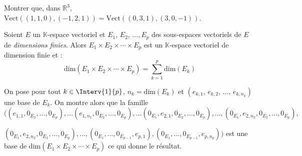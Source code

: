 \documentclass[a4paper,10pt]{report}
\begin{document}
\begin{exa} Montrer que, dans $\mathbb{R}^3$, $\textrm{Vect}((1,1,0), (-1,2,1))= \textrm{Vect}((0,3,1), (3,0,-1))$.
\end{exa}

\begin{prop}
Soient $E$ un $\mathbb{K}$-espace vectoriel et $E_1$, $E_2$, $\ldots, E_p$ des sous-espaces vectoriels de $E$ de \textit{dimensions finies}. Alors $E_1 \times E_2 \times \cdots \times E_p$ est un $\mathbb{K}$-espace vectoriel de dimension finie et :
$$ \textrm{dim}(E_1 \times E_2 \times \cdots \times E_p) = \sum_{k=1}^p \textrm{dim} (E_k)$$
\end{prop}

\begin{preuve} On pose pour tout $k \in \Interv{1}{p}$, $n_k = \textrm{dim} (E_k)$ et $(e_{k,1}, \, e_{k,2}, \, \ldots, \, e_{k,n_k})$ une base de $E_k$. On montre alors que la famille $((e_{1,1}, 0_{E_2}, \ldots, 0_{E_p}), \ldots (e_{1,n_1}, 0_{E_2}, \ldots, 0_{E_p}), \ldots (0_{E_1},e_{2,1}, 0_{E_2}, \ldots, 0_{E_p}), \ldots,(0_{E_1},e_{2,n_2}, 0_{E_2}, \ldots,0_{E_p}),$

\noindent $(0_{E_1},e_{2,n_2}, 0_{E_2}, \ldots,0_{E_p}), \ldots, (0_{E_1},\ldots, 0_{E_{p-1}}, e_{p,1}), (0_{E_1},\ldots, 0_{E_{p-1}}, e_{p,n_p}))$ est une base de $\textrm{dim}(E_1 \times E_2 \times \cdots \times E_p)$ ce qui donne le résultat.
\end{preuve}

\medskip

\end{document}
